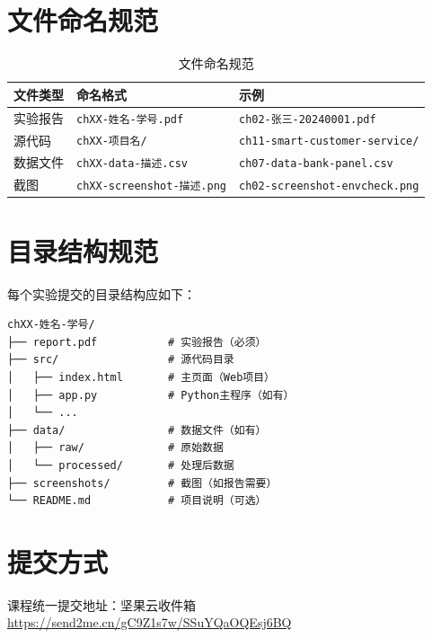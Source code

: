 \section{文件命名规范}

\begin{table}[H]
\centering
\begin{tabular}{lll}
\toprule
\textbf{文件类型} & \textbf{命名格式} & \textbf{示例} \\
\midrule
实验报告 & \texttt{chXX-姓名-学号.pdf} & \texttt{ch02-张三-20240001.pdf} \\
源代码 & \texttt{chXX-项目名/} & \texttt{ch11-smart-customer-service/} \\
数据文件 & \texttt{chXX-data-描述.csv} & \texttt{ch07-data-bank-panel.csv} \\
截图 & \texttt{chXX-screenshot-描述.png} & \texttt{ch02-screenshot-envcheck.png} \\
\bottomrule
\end{tabular}
\caption{文件命名规范}
\end{table}

\section{目录结构规范}

每个实验提交的目录结构应如下：

\begin{lstlisting}
chXX-姓名-学号/
├── report.pdf           # 实验报告（必须）
├── src/                 # 源代码目录
│   ├── index.html       # 主页面（Web项目）
│   ├── app.py           # Python主程序（如有）
│   └── ...
├── data/                # 数据文件（如有）
│   ├── raw/             # 原始数据
│   └── processed/       # 处理后数据
├── screenshots/         # 截图（如报告需要）
└── README.md            # 项目说明（可选）
\end{lstlisting}

\section{提交方式}

课程统一提交地址：坚果云收件箱 \url{https://send2me.cn/gC9Z1s7w/SSuYQaOQEsj6BQ}

